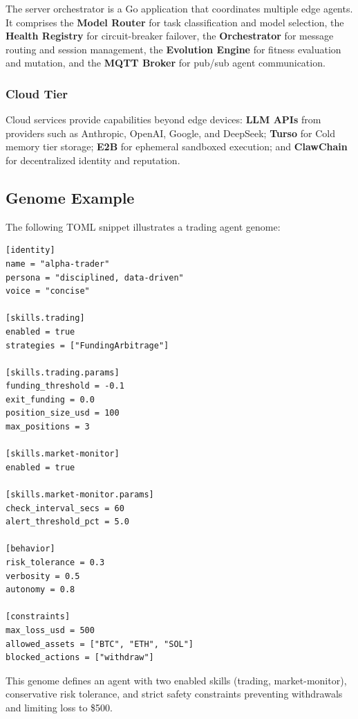 \documentclass[conference]{IEEEtran}
\begin{document}
The server orchestrator is a Go application that coordinates multiple edge agents. It comprises the \textbf{Model Router} for task classification and model selection, the \textbf{Health Registry} for circuit-breaker failover, the \textbf{Orchestrator} for message routing and session management, the \textbf{Evolution Engine} for fitness evaluation and mutation, and the \textbf{MQTT Broker} for pub/sub agent communication.

\subsubsection{Cloud Tier}

Cloud services provide capabilities beyond edge devices: \textbf{LLM APIs} from providers such as Anthropic, OpenAI, Google, and DeepSeek; \textbf{Turso} for Cold memory tier storage; \textbf{E2B} for ephemeral sandboxed execution; and \textbf{ClawChain} for decentralized identity and reputation.

\subsection{Genome Example}

The following TOML snippet illustrates a trading agent genome:

\begin{lstlisting}[style=tomlcode, caption={Example genome for a trading agent}]
[identity]
name = "alpha-trader"
persona = "disciplined, data-driven"
voice = "concise"

[skills.trading]
enabled = true
strategies = ["FundingArbitrage"]

[skills.trading.params]
funding_threshold = -0.1
exit_funding = 0.0
position_size_usd = 100
max_positions = 3

[skills.market-monitor]
enabled = true

[skills.market-monitor.params]
check_interval_secs = 60
alert_threshold_pct = 5.0

[behavior]
risk_tolerance = 0.3
verbosity = 0.5
autonomy = 0.8

[constraints]
max_loss_usd = 500
allowed_assets = ["BTC", "ETH", "SOL"]
blocked_actions = ["withdraw"]
\end{lstlisting}

This genome defines an agent with two enabled skills (trading, market-monitor), conservative risk tolerance, and strict safety constraints preventing withdrawals and limiting loss to \$500.
\end{document}

